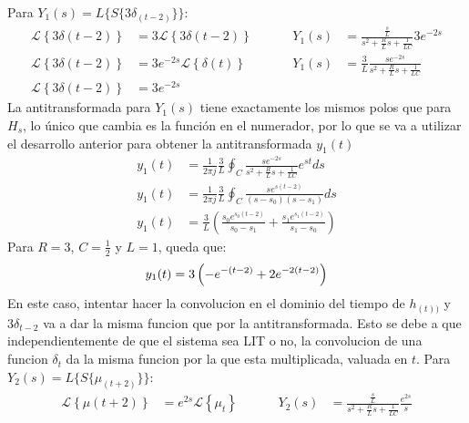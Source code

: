 \documentclass[12pt,a4paper]{report}
\begin{document}
\begin{enumerate}[label=\alph*)]
      Para $Y_1(s) = L\{S\{3\delta_{(t-2)}\}\}$:
      \begin{align*}
        \mathcal{L} \left\{3\delta (t-2)\right\} &= 3\mathcal{L}\left\{3\delta (t-2)\right\} \hspace{1cm} &Y_1(s) 
                                                 &= \frac{\frac{s}{L}}{s^2 + \frac{R}{L} s + \frac{1}{LC}} 3e^{-2s}\\[6pt]
        \mathcal{L} \left\{3\delta (t-2)\right\} &= 3 e^{-2s}\mathcal{L}\left\{\delta (t)\right\} &Y_1(s) 
                                                 &= \frac{3}{L}\frac{se^{-2s}}{s^2 + \frac{R}{L} s + \frac{1}{LC}}\\[6pt]
        \mathcal{L} \left\{3\delta (t-2)\right\} &= 3 e^{-2s}
      \end{align*}
      La antitransformada para $Y_1(s)$ tiene exactamente los mismos polos que para $H_s$, lo único que cambia es la
      función en el numerador, por lo que se va a utilizar el desarrollo anterior para obtener la antitransformada $y_1(t)$
      \begin{align*}
        y_1(t) &= \frac{1}{2\pi j} \frac{3}{L} \oint_C \frac{se^{-2s}}{s^2 + \frac{R}{L} s + \frac{1}{LC}} e^{st} ds\\[6pt]
        y_1(t) &= \frac{1}{2\pi j} \frac{3}{L} \oint_C \frac{se^{s(t-2)}}{(s-s_0)(s-s_1)} ds\\[6pt]
        y_1(t) &= \frac{3}{L} \left(\frac{s_0 e^{s_0(t-2)}}{s_0 - s_1} + \frac{s_1 e^{s_1(t-2)}}{s_1 - s_0}\right)
      \end{align*}
      Para $R = 3$, $C = \frac{1}{2}$ y $L = 1$, queda que:
      \begin{equation*}
        y_1(t) = 3\left(-e^{-(t-2)} + 2e^{-2(t-2)}\right)\\[6pt]
      \end{equation*}
      En este caso, intentar hacer la convolucion en el dominio del tiempo de $h_{(t))}$ y $3\delta_{t-2}$ va a dar la
      misma funcion que por la antitransformada. Esto se debe a que independientemente de que el sistema sea LIT o no,
      la convolucion de una funcion $\delta_t$ da la misma funcion por la que esta multiplicada, valuada en $t$.
      Para $Y_2(s) = L\{S\{\mu_{(t+2)}\}\}$:
      \begin{align*}
        \mathcal{L} \left\{\mu (t+2)\right\} &= e^{2s}\mathcal{L}\left\{\mu_t\right\} \hspace{1cm} &Y_2(s)
          &= \frac{\frac{s}{L}}{s^2 + \frac{R}{L} s + \frac{1}{LC}} \frac{e^{2s}}{s}\\[6pt]

\end{align*}
\end{enumerate}
\end{document}
